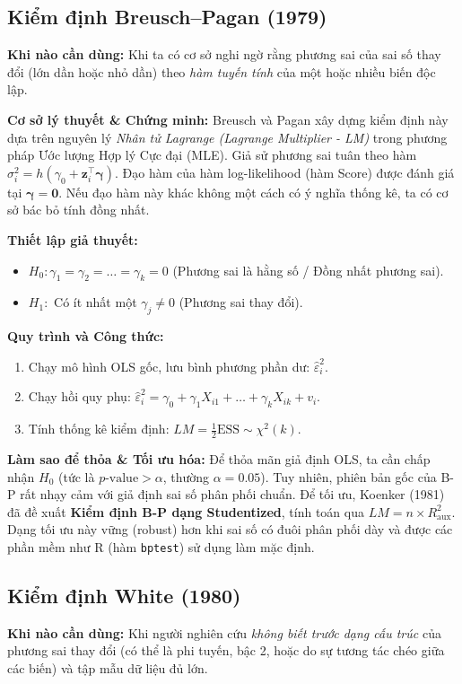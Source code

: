 	\subsection{Kiểm định Breusch--Pagan (1979)}
	\textbf{Khi nào cần dùng:} Khi ta có cơ sở nghi ngờ rằng phương sai của sai số thay đổi (lớn dần hoặc nhỏ dần) theo \textit{hàm tuyến tính} của một hoặc nhiều biến độc lập.
	
	\textbf{Cơ sở lý thuyết \& Chứng minh:} Breusch và Pagan \cite{breusch1979} xây dựng kiểm định này dựa trên nguyên lý \textit{Nhân tử Lagrange (Lagrange Multiplier - LM)} trong phương pháp Ước lượng Hợp lý Cực đại (MLE). Giả sử phương sai tuân theo hàm $\sigma_i^2 = h(\gamma_0 + \mathbf{z}_i^{\top}\boldsymbol{\gamma})$. Đạo hàm của hàm log-likelihood (hàm Score) được đánh giá tại $\boldsymbol{\gamma} = \mathbf{0}$. Nếu đạo hàm này khác không một cách có ý nghĩa thống kê, ta có cơ sở bác bỏ tính đồng nhất.
	
	\textbf{Thiết lập giả thuyết:}
	\begin{itemize}
		\item $H_0: \gamma_1 = \gamma_2 = \dots = \gamma_k = 0$ (Phương sai là hằng số / Đồng nhất phương sai).
		\item $H_1:$ Có ít nhất một $\gamma_j \neq 0$ (Phương sai thay đổi).
	\end{itemize}
	
	\textbf{Quy trình và Công thức:}
	\begin{enumerate}
		\item Chạy mô hình OLS gốc, lưu bình phương phần dư: $\hat{\varepsilon}_i^2$.
		\item Chạy hồi quy phụ: $\hat{\varepsilon}_i^2 = \gamma_0 + \gamma_1 X_{i1} + \dots + \gamma_k X_{ik} + v_i$.
		\item Tính thống kê kiểm định: $LM = \frac{1}{2}\text{ESS} \sim \chi^2(k)$. 
	\end{enumerate}
	\textbf{Làm sao để thỏa \& Tối ưu hóa:} Để thỏa mãn giả định OLS, ta cần chấp nhận $H_0$ (tức là $p\text{-value} > \alpha$, thường $\alpha = 0.05$). Tuy nhiên, phiên bản gốc của B-P rất nhạy cảm với giả định sai số phân phối chuẩn. Để tối ưu, Koenker (1981) \cite{koenker1981} đã đề xuất \textbf{Kiểm định B-P dạng Studentized}, tính toán qua $LM = n \times R^2_{\text{aux}}$. Dạng tối ưu này vững (robust) hơn khi sai số có đuôi phân phối dày và được các phần mềm như R (hàm \texttt{bptest}) sử dụng làm mặc định.
	
	\subsection{Kiểm định White (1980)}
	\textbf{Khi nào cần dùng:} Khi người nghiên cứu \textit{không biết trước dạng cấu trúc} của phương sai thay đổi (có thể là phi tuyến, bậc 2, hoặc do sự tương tác chéo giữa các biến) và tập mẫu dữ liệu đủ lớn.
	
